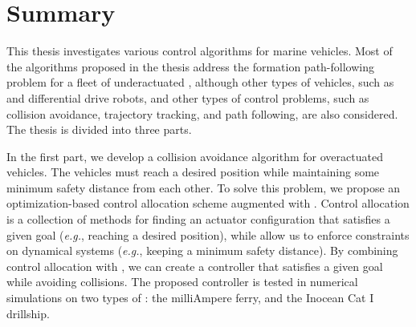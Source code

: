 \chapter*{Summary}

This thesis investigates various control algorithms for marine vehicles.
Most of the algorithms proposed in the thesis address the formation path-following problem for a fleet of underactuated , although other types of vehicles, such as  and differential drive robots, and other types of control problems, such as collision avoidance, trajectory tracking, and path following, are also considered.
The thesis is divided into three parts.

In the first part, we develop a collision avoidance algorithm for overactuated vehicles.
The vehicles must reach a desired position while maintaining some minimum safety distance from each other.
To solve this problem, we propose an optimization-based control allocation scheme augmented with .
Control allocation is a collection of methods for finding an actuator configuration that satisfies a given goal (\emph{e.g.}, reaching a desired position),
while  allow us to enforce constraints on dynamical systems (\emph{e.g.}, keeping a minimum safety distance).
By combining control allocation with , we can create a controller that satisfies a given goal while avoiding collisions.
The proposed controller is tested in numerical simulations on two types of : the milliAmpere ferry, and the Inocean Cat I drillship.

